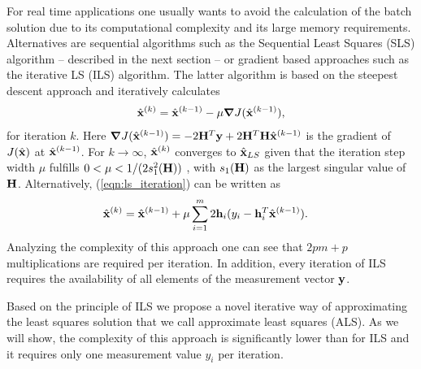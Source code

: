 \documentclass{article}
\begin{document}
For real time applications one usually wants to avoid the calculation of the batch solution due to 
its computational complexity and its large memory requirements. Alternatives are
sequential algorithms such as the Sequential Least Squares (SLS) algorithm 
-- described in the next section -- or
gradient based approaches such as the iterative LS (ILS) \cite{numeric} algorithm. 
The latter algorithm is based on the steepest descent approach and iteratively calculates
\begin{align}
\hat{\bf x}^{(k)} = \hat{\bf x}^{(k-1)} - \mu \boldsymbol{\nabla}J(\hat{\bf x}^{(k-1)}),
\label{eqn:ls_iteration}
\end{align}
for iteration $k$. Here $\boldsymbol{\nabla}J(\hat{\bf x}^{(k-1)}) = - 2 {\bf H}^T {\bf y} +  2{\bf H}^T {\bf H} \hat{\bf x}^{(k-1)}$ 
is the gradient of $J(\hat{\bf x})$ at $\hat{\bf x}^{(k-1)}$.
For $k \rightarrow \infty$, $\hat{\bf x}^{(k)}$ converges to $\hat{\bf x}_{LS}$ given that
the iteration step width $\mu$ fulfills $0<\mu<1/(2 s_1^2({\bf H}))$ \cite{numeric}, 
with $s_1({\bf H})$ as the largest singular value of $\bf H$.
Alternatively, (\ref{eqn:ls_iteration}) can be written as
\begin{align}
\hat{\bf x}^{(k)} 
              &= \hat{\bf x}^{(k-1)} + \mu \sum_{i=1}^{m} 2 {\bf h}_{i}( {y_{i}} - {\bf h}_{i}^T \hat{\bf x}^{(k-1)}). \label{eqn:ILS_grad}
\end{align}
Analyzing the complexity of this approach one can see that $2pm+p$ multiplications are required per iteration.
In addition, every iteration of ILS requires the availability of all elements 
of the measurement vector $\bf y$.

Based on the principle of ILS we propose a novel iterative way of 
approximating 
the least squares solution that we call approximate least squares (ALS). 
As we will 
show, the complexity of this approach is significantly 
lower than for ILS and it requires only
one measurement value $y_i$ per iteration.
\end{document}
